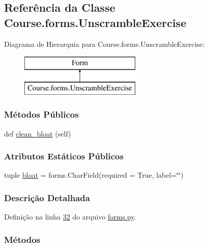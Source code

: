 \hypertarget{classCourse_1_1forms_1_1UnscrambleExercise}{}\subsection{Referência da Classe Course.\+forms.\+Unscramble\+Exercise}
\label{classCourse_1_1forms_1_1UnscrambleExercise}
Diagrama de Hierarquia para Course.\+forms.\+Unscramble\+Exercise\+:\begin{figure}[H]
\begin{center}
\leavevmode
\includegraphics[height=2.000000cm]{d5/d9e/classCourse_1_1forms_1_1UnscrambleExercise}
\end{center}
\end{figure}
\subsubsection*{Métodos Públicos}
\begin{DoxyCompactItemize}
\item 
def \hyperlink{classCourse_1_1forms_1_1UnscrambleExercise_affc5b0db18f92e1da41c9adf85bbb69a}{clean\+\_\+bloat} (self)
\end{DoxyCompactItemize}
\subsubsection*{Atributos Estáticos Públicos}
\begin{DoxyCompactItemize}
\item 
tuple \hyperlink{classCourse_1_1forms_1_1UnscrambleExercise_abff263e494816cb4477ee0f0727d3e65}{bloat} = forms.\+Char\+Field(required = True, label=\char`\"{}\char`\"{})
\end{DoxyCompactItemize}


\subsubsection{Descrição Detalhada}


Definição na linha \hyperlink{Course_2forms_8py_source_l00032}{32} do arquivo \hyperlink{Course_2forms_8py_source}{forms.\+py}.



\subsubsection{Métodos}
\hypertarget{classCourse_1_1forms_1_1UnscrambleExercise_affc5b0db18f92e1da41c9adf85bbb69a}{}

